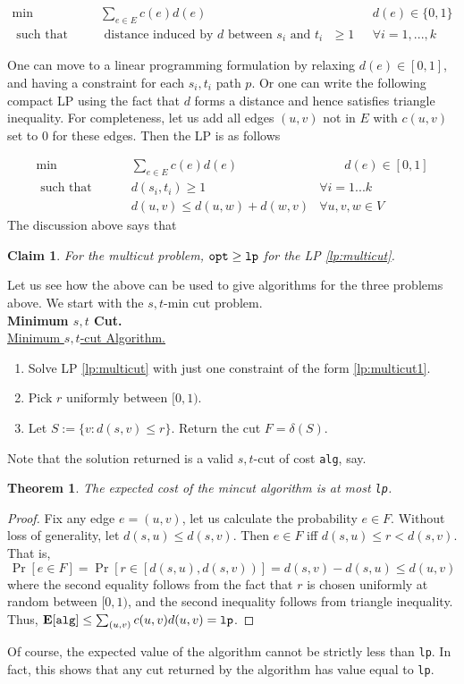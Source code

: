\documentclass[11pt]{article}
\newtheorem{theorem}{Theorem}
\newtheorem{claim}{Claim}
\def\opt{{\tt opt}}
\def\alg{{\tt alg}}
\def\lp{{\tt lp}}
\begin{document}
\begin{align*}
\min & \qquad \sum_{e\in E} c(e)d(e) &\qquad d(e) \in \{0,1\} \\
\textrm{ such that } & \qquad \textrm{ distance induced by $d$ between $s_i$ and $t_i$ } \ge 1& \qquad \forall i=1,...,k
\end{align*}

One can move to a linear programming formulation by relaxing $d(e) \in [0,1]$, and having a constraint for 
each $s_i,t_i$ path $p$. Or one can write the following compact LP using the fact that 
$d$ forms a distance and hence satisfies triangle inequality. For completeness, let us add all edges
$(u,v)$ not in $E$ with $c(u,v)$ set to $0$ for these edges. Then the LP is as follows

\begin{align}
\min & \qquad \sum_{e\in E} c(e)d(e) &\qquad d(e) \in [0,1] \label{lp:multicut}\\
\textrm{ such that } & \qquad d(s_i,t_i) \ge 1 & \forall i=1...k \label{lp:multicut1} \\
			& \qquad d(u,v) \le d(u,w) + d(w,v) & \forall u,v,w \in V
\end{align}
\noindent
The discussion above says that 
\begin{claim}
For the multicut problem, $\opt \ge \lp$ for the LP \eqref{lp:multicut}.
\end{claim}

Let us see how the above can be used to give algorithms for the three problems 
above. We start with the $s,t$-min cut problem. \\


\noindent
{\bf Minimum $s,t$ Cut.}\\
\underline{Minimum $s,t$-cut Algorithm.}
\begin{enumerate}
\item Solve LP \eqref{lp:multicut} with just one constraint of the form \eqref{lp:multicut1}.
\item Pick $r$ uniformly between $[0,1)$.
\item Let $S := \{v: d(s,v) \le r\}$. Return the cut $F = \delta(S)$.
\end{enumerate}
\noindent
Note that the solution returned is a valid $s,t$-cut of cost \alg, say.

\begin{theorem}
The expected cost of the mincut algorithm is at most \lp.
\end{theorem}
\begin{proof}
Fix any edge $e = (u,v)$, let us calculate the probability $e\in F$.
Without loss of generality, let $d(s,u) \le d(s,v)$. Then $e \in F$ iff 
$d(s,u) \le r < d(s,v)$. That is,
$$\Pr[e\in F] = \Pr[r \in \left[d(s,u),d(s,v)\right)] = d(s,v) - d(s,u) \le d(u,v)$$
where the second equality follows from the fact that $r$ is chosen uniformly 
at random between $[0,1)$, and the second inequality follows from triangle 
inequality. Thus, \mbox{$\E[\alg] \le \sum_{(u,v)} c(u,v)d(u,v) = \lp$.}
\end{proof}
\noindent
Of course, the expected value of the algorithm cannot be strictly less than \lp.
In fact, this shows that any cut returned by the algorithm has value equal to \lp. \\
\end{document}
